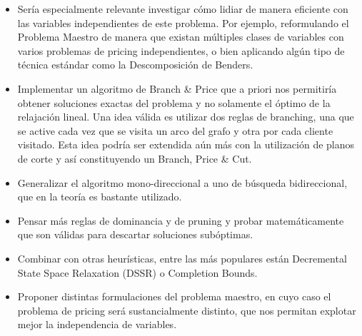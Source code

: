 \begin{itemize}
    \item Sería especialmente relevante investigar cómo lidiar de manera eficiente con las variables independientes de este problema. Por ejemplo, reformulando el Problema Maestro de manera que existan múltiples clases de variables con varios problemas de pricing independientes, o bien aplicando algún tipo de técnica estándar como la Descomposición de Benders.  

    \item Implementar un algoritmo de Branch \& Price que a priori nos permitiría obtener soluciones exactas del problema y no solamente el óptimo de la relajación lineal. Una idea válida es utilizar dos reglas de branching, una que se active cada vez que se visita un arco del grafo y otra por cada cliente visitado. Esta idea podría ser extendida aún más con la utilización de planos de corte y así constituyendo un Branch, Price \& Cut.
    
    \item Generalizar el algoritmo mono-direccional a uno de búsqueda bidireccional, que en la teoría es bastante utilizado.

    \item Pensar más reglas de dominancia y de pruning y probar matemáticamente que son válidas para descartar soluciones subóptimas.
        
    \item Combinar con otras heurísticas, entre las más populares están Decremental State Space Relaxation (DSSR) o Completion Bounds. 

    \item Proponer distintas formulaciones del problema maestro, en cuyo caso el problema de pricing será sustancialmente distinto, que nos permitan explotar mejor la independencia de variables.
    
\end{itemize}

